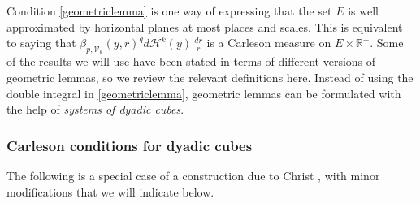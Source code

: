 \documentclass[12pt]{amsart}
\newcommand{\R}{\mathbb R}
\numberwithin{equation}{section}
\theoremstyle{plain}
\theoremstyle{definition}
\theoremstyle{remark}
\begin{document}
    Condition \eqref{geometriclemma} is one way of expressing that the set $E$ is well approximated by horizontal planes at most places and scales. This is equivalent to saying that $\beta_{p,\mathcal V_k}(y,r)^q d\mathcal H^k(y)\,\frac{dr}{r}$ is a Carleson measure on $E\times \R^+$.
    Some of the results we will use have been stated in terms of different versions of geometric lemmas, so we  review the relevant definitions here. Instead of using the double integral in \eqref{geometriclemma}, geometric lemmas can be formulated with the help of 
    \emph{systems of dyadic cubes}.

    \subsubsection{Carleson conditions for dyadic cubes}



The following is a special case of a construction due to Christ \cite{christ}, with minor modifications that we will indicate below.
    
\end{document}
